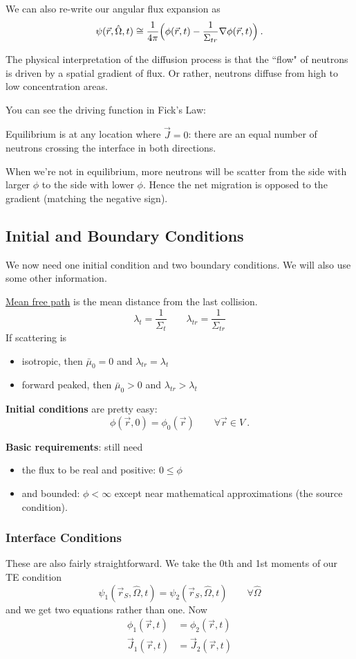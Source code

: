 \documentclass[12pt]{article}
\newcommand{\vOmega}{\ensuremath{\hat{\Omega}}}
\begin{document}
We can also re-write our angular flux expansion as
\[\psi(\vec{r}, \vOmega, t) \cong \frac{1}{4\pi}\Bigl(\phi(\vec{r}, t)  -\frac{1}{\Sigma_{tr}} \nabla \phi(\vec{r}, t)\Bigr) \:.\]

The physical interpretation of the diffusion process is that the ``flow" of neutrons is driven by a spatial gradient of flux. Or rather, neutrons diffuse from high to low concentration areas.

You can see the driving function in Fick's Law: 

Equilibrium is at any location where $\vec{J} = 0$: there are an equal number of neutrons crossing the interface in both directions. 

When we're not in equilibrium, more neutrons will be scatter from the side with larger $\phi$ to the side with lower $\phi$. Hence the net migration is opposed to the gradient (matching the negative sign). 

\subsection{Initial and Boundary Conditions}

We now need one initial condition and two boundary conditions. We will also use some other information.

\underline{Mean free path} is the mean distance from the last collision.
\[\lambda_{t} = \frac{1}{\Sigma_t} \qquad \lambda_{tr} = \frac{1}{\Sigma_{tr}}\]
%
If scattering is 
\begin{itemize}
\item isotropic, then $\bar{\mu}_0 = 0$ and $\lambda_{tr} = \lambda_{t}$
\item forward peaked, then $\bar{\mu}_0 > 0$ and $\lambda_{tr} > \lambda_{t}$
\end{itemize}	

\textbf{Initial conditions} are pretty easy:
\[\phi(\vec{r}, 0) = \phi_0(\vec{r}) \qquad \forall \vec{r} \in V \:.\]

\textbf{Basic requirements}: still need 
\begin{itemize}
\item the flux to be real and positive: $0 \leq \phi$
\item and bounded: $\phi < \infty$ except near mathematical approximations (the source condition). 
\end{itemize}

\subsubsection{Interface Conditions}
These are also fairly straightforward. We take the 0th and 1st moments of our TE condition
\[\psi_1(\vec{r}_S, \vOmega, t) = \psi_2(\vec{r}_S,\vOmega, t)\qquad \forall \vOmega\]
and we get two equations rather than one. Now
\begin{align}
\phi_1(\vec{r}, t) &= \phi_2(\vec{r}, t) \\
\vec{J}_1(\vec{r}, t) &= \vec{J}_2(\vec{r}, t)
\end{align}
\end{document}
